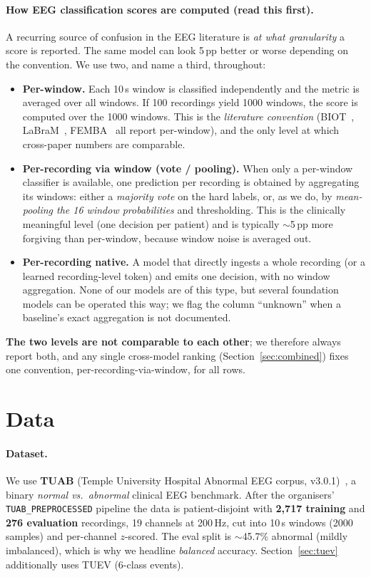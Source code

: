 \documentclass[10pt,a4paper]{article}
\begin{document}
\paragraph{How EEG classification scores are computed (read this first).} A recurring source of confusion in
the EEG literature is \emph{at what granularity} a score is reported. The same model can look 5\,pp better
or worse depending on the convention. We use two, and name a third, throughout:
\begin{itemize}
  \item \textbf{Per-window.} Each 10\,s window is classified independently and the metric is averaged over
  all windows. If 100 recordings yield 1000 windows, the score is computed over the 1000 windows. This is
  the \emph{literature convention} (BIOT~\cite{biot}, LaBraM~\cite{labram}, FEMBA~\cite{femba} all report
  per-window), and the only level at which cross-paper numbers are comparable.
  \item \textbf{Per-recording via window (vote / pooling).} When only a per-window classifier is available,
  one prediction per recording is obtained by aggregating its windows: either a \emph{majority vote} on
  the hard labels, or, as we do, by \emph{mean-pooling the 16 window probabilities} and thresholding. This
  is the clinically meaningful level (one decision per patient) and is typically $\sim$5\,pp more forgiving
  than per-window, because window noise is averaged out.
  \item \textbf{Per-recording native.} A model that directly ingests a whole recording (or a learned
  recording-level token) and emits one decision, with no window aggregation. None of our models are of this
  type, but several foundation models can be operated this way; we flag the column ``unknown'' when a
  baseline's exact aggregation is not documented.
\end{itemize}
\textbf{The two levels are not comparable to each other}; we therefore always report both, and any single
cross-model ranking (Section~\ref{sec:combined}) fixes one convention, per-recording-via-window, for
all rows.

\section{Data}
\label{sec:data}

\paragraph{Dataset.} We use \textbf{TUAB} (Temple University Hospital Abnormal EEG corpus,
v3.0.1)~\cite{tuab,kiessner2023}, a binary \emph{normal vs.\ abnormal} clinical EEG benchmark. After the
organisers' \texttt{TUAB\_PREPROCESSED} pipeline the data is patient-disjoint with \textbf{2{,}717 training}
and \textbf{276 evaluation} recordings, 19 channels at 200\,Hz, cut into 10\,s windows (2000 samples) and
per-channel $z$-scored. The eval split is $\sim$45.7\% abnormal (mildly imbalanced), which is why we headline
\emph{balanced} accuracy. Section~\ref{sec:tuev} additionally uses TUEV (6-class events).
\end{document}
